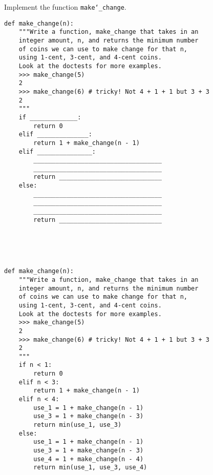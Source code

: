 \begin{blocksection}
\question Implement the function \texttt{make\char`_change}.\\

\begin{lstlisting}
def make_change(n):
    """Write a function, make_change that takes in an
    integer amount, n, and returns the minimum number
    of coins we can use to make change for that n, 
    using 1-cent, 3-cent, and 4-cent coins. 
    Look at the doctests for more examples.
    >>> make_change(5)
    2
    >>> make_change(6) # tricky! Not 4 + 1 + 1 but 3 + 3
    2
    """
    if _____________:
        return 0
    elif ______________:
        return 1 + make_change(n - 1)
    elif _______________:
        ___________________________________
        ___________________________________
        return ____________________________
    else:
        ___________________________________
        ___________________________________
        ___________________________________
        return ____________________________


\end{lstlisting}

\end{blocksection}
\\ \\
\begin{blocksection}

\begin{solution}[1in]
\begin{lstlisting}
def make_change(n):
    """Write a function, make_change that takes in an
    integer amount, n, and returns the minimum number
    of coins we can use to make change for that n, 
    using 1-cent, 3-cent, and 4-cent coins. 
    Look at the doctests for more examples.
    >>> make_change(5)
    2
    >>> make_change(6) # tricky! Not 4 + 1 + 1 but 3 + 3
    2
    """
    if n < 1:
        return 0
    elif n < 3:
        return 1 + make_change(n - 1)
    elif n < 4:
        use_1 = 1 + make_change(n - 1)
        use_3 = 1 + make_change(n - 3)
        return min(use_1, use_3)
    else:
        use_1 = 1 + make_change(n - 1)
        use_3 = 1 + make_change(n - 3)
        use_4 = 1 + make_change(n - 4)
        return min(use_1, use_3, use_4)
\end{lstlisting}
\end{solution}
\end{blocksection}